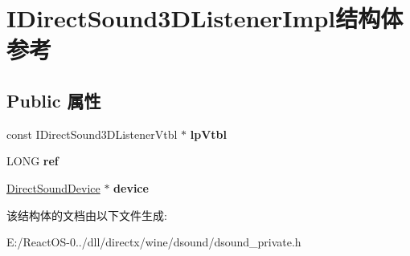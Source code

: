 \hypertarget{struct_i_direct_sound3_d_listener_impl}{}\section{I\+Direct\+Sound3\+D\+Listener\+Impl结构体 参考}
\label{struct_i_direct_sound3_d_listener_impl}
\subsection*{Public 属性}
\begin{DoxyCompactItemize}
\item 
\mbox{\label{struct_i_direct_sound3_d_listener_impl_ab2ec2905b0eb21c81d0f76a6da9d09fe}} 
const I\+Direct\+Sound3\+D\+Listener\+Vtbl $\ast$ {\bfseries lp\+Vtbl}
\item 
\mbox{\label{struct_i_direct_sound3_d_listener_impl_a8f786dd2b8b6dbe3ed504638250e8768}} 
L\+O\+NG {\bfseries ref}
\item 
\mbox{\label{struct_i_direct_sound3_d_listener_impl_a5d109200c3fac26e8bae85a97aa8ae48}} 
\hyperlink{struct_direct_sound_device}{Direct\+Sound\+Device} $\ast$ {\bfseries device}
\end{DoxyCompactItemize}


该结构体的文档由以下文件生成\+:\begin{DoxyCompactItemize}
\item 
E\+:/\+React\+O\+S-\/0../dll/directx/wine/dsound/dsound\+\_\+private.\+h\end{DoxyCompactItemize}
